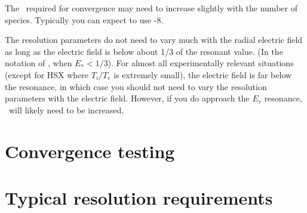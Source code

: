 The \Nx~required for convergence may need to increase slightly with the number of species.
Typically you can expect to use -8.

The resolution parameters do not need to vary much with the radial
electric field as long as the electric field is below about 1/3 of the resonant value.
(In the notation of \cite{sfincsPaper}, when $E_*<1/3$).
For almost all experimentally relevant situations (except for HSX where $T_i/T_e$ is extremely small),
the electric field is far below the resonance, in which case you should not need to vary the resolution
parameters with the electric field.
However, if you do approach the $E_r$ resonance, \Nx~will likely need to be increased.

\section{Convergence testing}
\label{sec:convergence}

\section{Typical resolution requirements}

